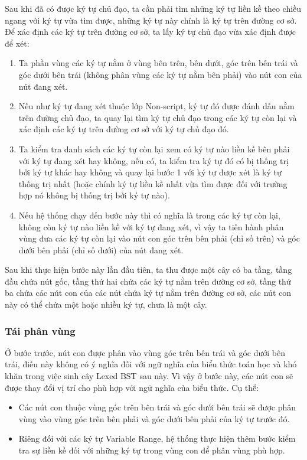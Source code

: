 \documentclass[a4paper,12pt]{article}
\begin{document}
	Sau khi đã có được ký tự chủ đạo, ta cần phải tìm những ký tự liền kề theo chiều ngang với ký tự vừa tìm được, những ký tự này chính là ký tự trên đường cơ sở. Để xác định các ký tự trên đường cơ sở, ta lấy ký tự chủ đạo vừa xác định được để xét:
	
	\begin{enumerate}
		\item Ta phần vùng các ký tự nằm ở vùng bên trên, bên dưới, góc trên bên trái và góc dưới bên trái (không phân vùng các ký tự nằm bên phải) vào nút con của nút đang xét.
		\item Nếu như ký tự đang xét thuộc lớp Non-script, ký tự đó được đánh dấu nằm trên đường chủ đạo, ta quay lại tìm ký tự chủ đạo trong các ký tự còn lại và xác định các ký tự trên đường cơ sở với ký tự chủ đạo đó.
		\item Ta kiểm tra danh sách các ký tự còn lại xem có ký tự nào liền kề bên phải với ký tự đang xét hay không, nếu có, ta kiểm tra ký tự đó có bị thống trị bởi ký tự khác hay không và quay lại bước 1 với ký tự được xét là ký tự thống trị nhất (hoặc chính ký tự liền kề nhất vừa tìm được đối với trường hợp nó không bị thống trị bởi ký tự nào).
		\item Nếu hệ thống chạy đến bước này thì có nghĩa là trong các ký tự còn lại, không còn ký tự nào liền kề với ký tự đang xét, vì vậy ta tiến hành phân vùng đưa các ký tự còn lại vào nút con góc trên bên phải (chỉ số trên) và góc dưới bên phải (chỉ số dưới) của nút đang xét.
	\end{enumerate}
	
	Sau khi thực hiện bước này lần đầu tiên, ta thu được một cây có ba tầng, tầng đầu chứa nút gốc, tầng thứ hai chứa các ký tự nằm trên đường cơ sở, tầng thứ ba chứa các nút con của các nút chứa ký tự nằm trên đường cơ sở, các nút con này có thể chứa một hoặc nhiều ký tự, chưa là một cây.
	
	\subsubsection*{Tái phân vùng}
	Ở bước trước, nút con được phân vào vùng góc trên bên trái và góc dưới bên trái, điều này không có ý nghĩa đối với ngữ nghĩa của biểu thức toán học và khó khăn trong việc sinh cây Lexed BST\cite{zanibbi} sau này. Vì vậy ở bước này, các nút con sẽ được thay đổi vị trí cho phù hợp với ngữ nghĩa của biểu thức. Cụ thể:
	
	\begin{itemize}
		\item Các nút con thuộc vùng góc trên bên trái và góc dưới bên trái sẽ được phân vùng vào vùng góc trên bên phải và góc dưới bên phải của ký tự trước đó.
		\item Riêng đối với các ký tự Variable Range, hệ thống thực hiện thêm bước kiểm tra sự liền kề đối với những ký tự trong vùng con để phân vùng phù hợp.
	\end{itemize}
	
\end{document}
